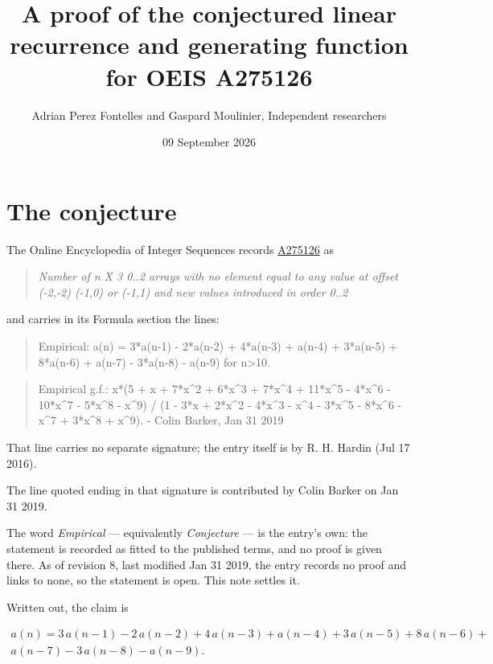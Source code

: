 \documentclass[11pt]{article}
\title{A proof of the conjectured linear recurrence and generating function for OEIS A275126}
\author{Adrian Perez Fontelles and Gaspard Moulinier, Independent researchers}
\date{09 September 2026}
\theoremstyle{definition}
\begin{document}
\maketitle
\section{The conjecture}

The Online Encyclopedia of Integer Sequences records \href{https://oeis.org/A275126}{A275126} as

\begin{quote}\itshape Number of n X 3 0..2 arrays with no element equal to any value at offset (-2,-2) (-1,0) or (-1,1) and new values introduced in order 0..2\end{quote}

and carries in its Formula section the lines:

\begin{quote}\ttfamily Empirical: a(n) = 3*a(n-1) - 2*a(n-2) + 4*a(n-3) + a(n-4) + 3*a(n-5) + 8*a(n-6) + a(n-7) - 3*a(n-8) - a(n-9) for n>10.\end{quote}

\begin{quote}\ttfamily Empirical g.f.: x*(5 + x + 7*x\textasciicircum{}2 + 6*x\textasciicircum{}3 + 7*x\textasciicircum{}4 + 11*x\textasciicircum{}5 - 4*x\textasciicircum{}6 - 10*x\textasciicircum{}7 - 5*x\textasciicircum{}8 - x\textasciicircum{}9) / (1 - 3*x + 2*x\textasciicircum{}2 - 4*x\textasciicircum{}3 - x\textasciicircum{}4 - 3*x\textasciicircum{}5 - 8*x\textasciicircum{}6 - x\textasciicircum{}7 + 3*x\textasciicircum{}8 + x\textasciicircum{}9). - Colin Barker, Jan 31 2019\end{quote}

That line carries no separate signature; the entry itself is by R. H. Hardin (Jul 17 2016).

The line quoted ending in that signature is contributed by Colin Barker on Jan 31 2019.

The word {\itshape Empirical} --- equivalently {\itshape Conjecture} --- is the entry's own: the statement is recorded as fitted to the published terms, and no proof is given there. As of revision 8, last modified Jan 31 2019, the entry records no proof and links to none, so the statement is open. This note settles it.

Written out, the claim is

\begin{multline*} a(n) = 3\,a(n-1) - 2\,a(n-2) + 4\,a(n-3) + a(n-4) + 3\,a(n-5) + 8\,a(n-6) + \\ a(n-7) - 3\,a(n-8) - a(n-9). \end{multline*}
\end{document}
